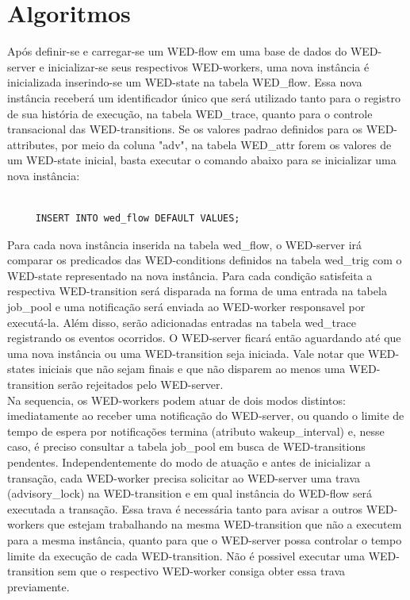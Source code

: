 \documentclass[conference]{IEEEtran}
\begin{document}
\section{Algoritmos}
Após definir-se e carregar-se um WED-flow em uma base de dados do WED-server e inicializar-se seus respectivos WED-workers, uma
nova instância é inicializada inserindo-se um WED-state na tabela WED\_flow. Essa nova instância receberá um identificador
único que será utilizado tanto para o registro de sua história de execução, na tabela WED\_trace, quanto para o controle
transacional das WED-transitions. Se os valores padrao definidos para os WED-attributes, por meio da coluna "adv", na 
tabela WED\_attr forem os valores de um WED-state inicial, basta executar o comando abaixo para se inicializar uma nova
instância:
\begin{Verbatim}[fontsize=\small]

     INSERT INTO wed_flow DEFAULT VALUES;
\end{Verbatim}
  Para cada nova instância inserida na tabela wed\_flow, o WED-server irá comparar os predicados das WED-conditions definidos
na tabela wed\_trig com o WED-state representado na nova instância. Para cada condição satisfeita a respectiva WED-transition
será disparada na forma de uma entrada na tabela job\_pool e uma notificação será enviada ao WED-worker responsavel
por executá-la. Além disso, serão adicionadas entradas na tabela wed\_trace registrando os eventos ocorridos. O WED-server
ficará então aguardando até que uma nova instância ou uma WED-transition seja iniciada. Vale notar que WED-states iniciais 
que não sejam finais e que não disparem ao menos uma WED-transition serão rejeitados pelo WED-server.
\\
\indent  Na sequencia, os WED-workers podem atuar de dois modos distintos: imediatamente ao receber uma notificação do WED-server, ou quando o limite
de tempo de espera por notificações termina (atributo wakeup\_interval) e, nesse caso, é preciso consultar a tabela job\_pool em
busca de WED-transitions pendentes. Independentemente do modo de atuação e antes de inicializar a transação, cada WED-worker 
precisa solicitar ao WED-server uma trava (advisory\_lock) na WED-transition e em qual instância do WED-flow será executada a transação. 
Essa trava é necessária tanto para avisar a outros WED-workers que estejam trabalhando na mesma WED-transition que não a 
executem para a mesma instância, quanto para que o WED-server possa controlar o tempo limite da execução de cada WED-transition. 
Não é possivel executar uma WED-transition sem que o respectivo WED-worker consiga obter essa trava previamente.
\end{document}
